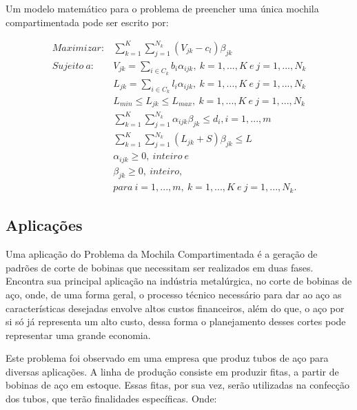Um modelo matemático para o problema de preencher uma única mochila compartimentada pode ser escrito por:

\begin{eqnarray}
	Maximizar: & \displaystyle \sum_{k = 1}^{K}\sum_{j = 1}^{N_{k}}(V_{jk} - c_{l})\beta_{jk} \\
	Sujeito \ a: &  \displaystyle V_{jk} = \sum_{i \in C_{k}}b_{i}\alpha_{ijk}, \ k = 1, ..., K \ e \ j = 1, ..., N_{k} \\
	& \displaystyle L_{jk} = \sum_{i \in C_{k}}l_{i}\alpha_{ijk}, \ k = 1, ..., K \ e \ j = 1, ..., N_{k} \\
	& \displaystyle L_{min} \leq L_{jk} \leq L_{max}, \ k = 1, ..., K \ e \ j = 1, ..., N_{k} \\
	& \displaystyle \sum_{k = 1}^{K}\sum_{j = 1}^{N_{k}}\alpha_{ijk}\beta_{jk} \leq d_{i}, i = 1, ..., m \\
	& \displaystyle \sum_{k = 1}^{K}\sum_{j = 1}^{N_{k}}(L_{jk} + S)\beta_{jk} \leq L \\
	& \displaystyle \alpha_{ijk} \geq 0, \ inteiro \ e \nonumber\\
	& \displaystyle \beta_{jk} \geq 0, \ inteiro, \nonumber\\
	& \displaystyle para \ i = 1, ..., m, \ k = 1, ..., K \ e \ j = 1, ..., N_{k}. \nonumber
\end{eqnarray}

\subsection{Aplicações}

Uma aplicação do Problema da Mochila Compartimentada é a geração de padrões de corte de bobinas que necessitam ser realizados em duas fases. Encontra sua principal aplicação na indústria metalúrgica, no corte de bobinas de aço, onde, de uma forma geral, o processo técnico necessário para dar ao aço as características desejadas envolve altos custos financeiros, além do que, o aço por si só já representa um alto custo, dessa forma o planejamento desses cortes pode representar uma grande economia.

Este problema foi observado em uma empresa que produz tubos de aço para diversas aplicações. A linha de produção consiste em produzir fitas, a partir de bobinas de aço em estoque. Essas fitas, por sua vez, serão utilizadas na confecção dos tubos, que terão finalidades específicas. Onde:

